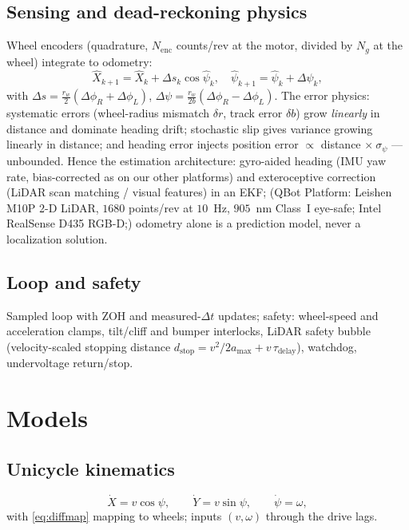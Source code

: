 \documentclass[conference]{IEEEtran}
\begin{document}
\subsection{Sensing and dead-reckoning physics}
Wheel encoders (quadrature, $N_{\mathrm{enc}}$ counts/rev at the motor, divided by $N_g$ at the wheel) integrate to odometry:
\begin{equation}
\hat X_{k+1} = \hat X_k + \Delta s_k\cos\hat\psi_k,\quad
\hat\psi_{k+1} = \hat\psi_k + \Delta\psi_k,
\end{equation}
with $\Delta s = \tfrac{r_w}{2}(\Delta\phi_R + \Delta\phi_L)$, $\Delta\psi = \tfrac{r_w}{2b}(\Delta\phi_R - \Delta\phi_L)$. The error physics: systematic errors (wheel-radius mismatch $\delta r$, track error $\delta b$) grow \emph{linearly} in distance and dominate heading drift; stochastic slip gives variance growing linearly in distance; and heading error injects position error $\propto$ distance $\times\ \sigma_\psi$ --- unbounded. Hence the estimation architecture: gyro-aided heading (IMU yaw rate, bias-corrected as on our other platforms) and exteroceptive correction (LiDAR scan matching / visual features) in an EKF; (QBot Platform: Leishen M10P 2-D LiDAR, $1680$ points/rev at $10$~Hz, $905$~nm Class~I eye-safe; Intel RealSense D435 RGB-D;) odometry alone is a prediction model, never a localization solution.

\subsection{Loop and safety}
Sampled loop with ZOH and measured-$\Delta t$ updates; safety: wheel-speed and acceleration clamps, tilt/cliff and bumper interlocks, LiDAR safety bubble (velocity-scaled stopping distance $d_{\mathrm{stop}} = v^2/2a_{\max} + v\,\tau_{\mathrm{delay}}$), watchdog, undervoltage return/stop.

\section{Models}
\subsection{Unicycle kinematics}
\begin{equation}
\dot X = v\cos\psi,\qquad \dot Y = v\sin\psi,\qquad \dot\psi = \omega,
\label{eq:unicycle}
\end{equation}
with \eqref{eq:diffmap} mapping to wheels; inputs $(v,\omega)$ through the drive lags.
\end{document}

